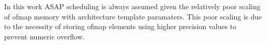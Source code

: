 In this work ASAP scheduling is always assumed given the relatively poor scaling
of ofmap memory with architecture template paramaters. This poor scaling is due
to the necessity of storing ofmap elements using higher precision values to
prevent numeric overflow. 


